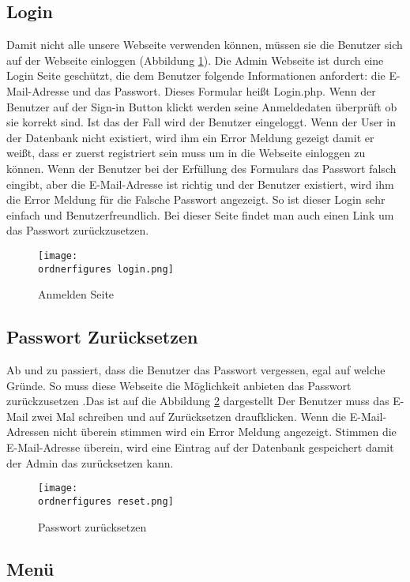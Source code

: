\subsection{Login}
Damit nicht alle unsere Webseite verwenden können, müssen sie die Benutzer sich auf der Webseite einloggen (Abbildung \ref{fi:login}). Die Admin Webseite ist durch eine Login Seite geschützt, die dem Benutzer folgende Informationen anfordert: die E-Mail-Adresse und das Passwort. Dieses Formular heißt Login.php. Wenn der Benutzer auf der Sign-in Button klickt werden seine Anmeldedaten überprüft ob sie korrekt sind. Ist das der Fall wird der Benutzer eingeloggt. Wenn der User in der Datenbank nicht existiert, wird ihm ein Error Meldung gezeigt damit er weißt, dass er zuerst registriert sein muss um in die Webseite einloggen zu können. Wenn der Benutzer bei der Erfüllung des Formulars das Passwort falsch eingibt, aber die E-Mail-Adresse ist richtig und der Benutzer existiert, wird ihm die Error Meldung für die Falsche Passwort angezeigt. So ist dieser Login sehr einfach und Benutzerfreundlich. Bei dieser Seite findet man auch einen Link um das Passwort zurückzusetzen.

\begin{figure}[H]
	\centering
	\texttt{[image: \\ordnerfigures login.png]}
	\caption{Anmelden Seite}
	\label{fi:login}
\end{figure}

\subsection{Passwort Zurücksetzen}
Ab und zu passiert, dass die Benutzer das Passwort vergessen, egal auf welche Gründe. So muss diese Webseite die Möglichkeit anbieten das Passwort zurückzusetzen .Das ist auf die Abbildung \ref{fi:reset} dargestellt Der Benutzer muss das E-Mail zwei Mal schreiben und auf Zurücksetzen draufklicken. Wenn die E-Mail-Adressen nicht überein stimmen wird ein Error Meldung angezeigt. Stimmen die E-Mail-Adresse überein, wird eine Eintrag auf der Datenbank gespeichert damit der Admin das zurücksetzen kann.
\begin{figure}[H]
	\centering
	\texttt{[image: \\ordnerfigures reset.png]}
	\caption{Passwort zurücksetzen}
	\label{fi:reset}
\end{figure}

\subsection{Menü}

